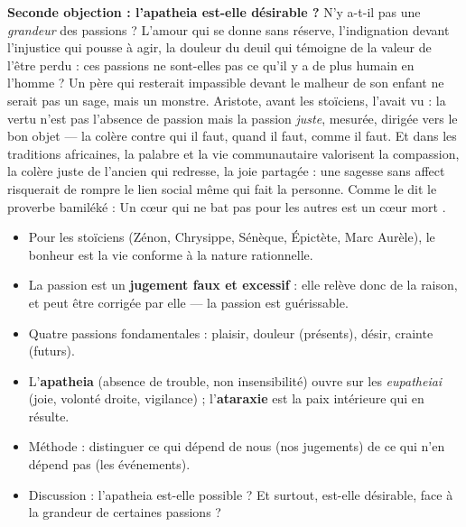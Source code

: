 \documentclass[11pt]{article}
\begin{document}
\textbf{Seconde objection : l'apatheia est-elle désirable ?} N'y a-t-il pas une \emph{grandeur} des passions ? L'amour qui se donne sans réserve, l'indignation devant l'injustice qui pousse à agir, la douleur du deuil qui témoigne de la valeur de l'être perdu : ces passions ne sont-elles pas ce qu'il y a de plus humain en l'homme ? Un père qui resterait impassible devant le malheur de son enfant ne serait pas un sage, mais un monstre. Aristote, avant les stoïciens, l'avait vu : la vertu n'est pas l'absence de passion mais la passion \emph{juste}, mesurée, dirigée vers le bon objet — la colère contre qui il faut, quand il faut, comme il faut. Et dans les traditions africaines, la palabre et la vie communautaire valorisent la compassion, la colère juste de l'ancien qui redresse, la joie partagée : une sagesse sans affect risquerait de rompre le lien social même qui fait la personne. Comme le dit le proverbe bamiléké : \guillemotleft Un cœur qui ne bat pas pour les autres est un cœur mort \guillemotright.

\begin{aretenir}
\begin{itemize}
\item Pour les stoïciens (Zénon, Chrysippe, Sénèque, Épictète, Marc Aurèle), le bonheur est la vie conforme à la nature rationnelle.
\item La passion est un \textbf{jugement faux et excessif} : elle relève donc de la raison, et peut être corrigée par elle — la passion est guérissable.
\item Quatre passions fondamentales : plaisir, douleur (présents), désir, crainte (futurs).
\item L'\textbf{apatheia} (absence de trouble, non insensibilité) ouvre sur les \emph{eupatheiai} (joie, volonté droite, vigilance) ; l'\textbf{ataraxie} est la paix intérieure qui en résulte.
\item Méthode : distinguer ce qui dépend de nous (nos jugements) de ce qui n'en dépend pas (les événements).
\item Discussion : l'apatheia est-elle possible ? Et surtout, est-elle désirable, face à la grandeur de certaines passions ?
\end{itemize}
\end{aretenir}
\end{document}
